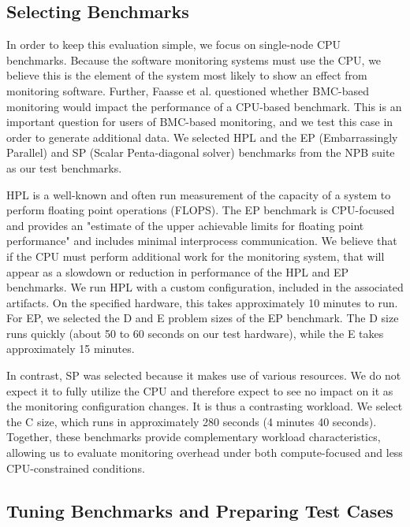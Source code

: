 \documentclass[conference]{IEEEtran}
\begin{document}
\subsection{Selecting Benchmarks}

In order to keep this evaluation simple, we focus on single-node CPU 
benchmarks. Because the software monitoring systems must use the CPU, we 
believe this is the element of the system most likely to show an effect from 
monitoring software. Further, Faasse et al.\cite{faasseOutBandPerformance2020}
questioned whether BMC-based monitoring would impact the performance of a CPU-based
benchmark. This is an important question for users of BMC-based monitoring, and
we test this case in order to generate additional data.
We selected HPL\cite{dongarraLINPACKBenchmarkPresent2003} and the EP (Embarrassingly Parallel) and SP (Scalar Penta-diagonal solver) benchmarks from the NPB suite\cite{NASParallelBenchmarksa} as our test benchmarks. 

HPL is a well-known and often run measurement of the capacity of a system to 
perform floating point operations (FLOPS). The EP benchmark is 
CPU-focused and provides an "estimate of the
upper achievable limits for floating point performance"\cite{NASParallelBenchmarks}
and includes minimal interprocess communication. We believe that if the CPU 
must perform additional work for the monitoring system, that will appear as a 
slowdown or reduction in performance of the HPL and EP benchmarks.
We run HPL with a custom configuration, included in the associated artifacts\cite{HPCNexusLabImpactofMonitoringonHPCWorkloads}. On 
the specified hardware, this takes approximately 10 minutes to run.
For EP, we selected the D and E problem sizes of the EP benchmark. The D size runs 
quickly (about 50 to 60 seconds on our test hardware), while the E takes 
approximately 15 minutes.

In contrast, SP was selected because it makes use of various resources. We do not 
expect it to fully utilize the CPU and therefore expect to see no impact on it 
as the monitoring configuration changes. It is thus a contrasting workload.
We 
select the C size, which runs in approximately 280 seconds (4 minutes 40 seconds).
Together, these benchmarks provide complementary workload characteristics, allowing us to evaluate monitoring overhead under both compute-focused and less CPU-constrained conditions.

\subsection{Tuning Benchmarks and Preparing Test Cases}
\end{document}
